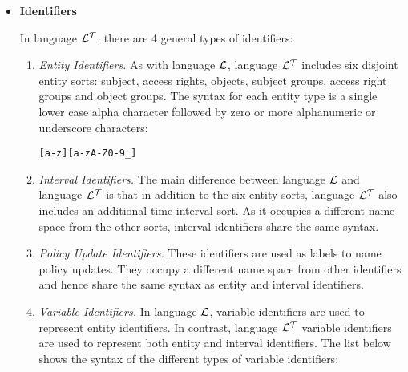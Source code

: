 \documentclass[11pt]{report}
\newenvironment{vverbatim}
{
  \begin{alltt}
}
{
    \vspace{-\baselineskip}
  \end{alltt}
}
\begin{document}
          \begin{itemize}

            \item
              {\bf Identifiers}

                In language ${\cal L^T}$, there are 4 general types of
                identifiers:

                \begin{enumerate}
                  \item
                    {\em Entity Identifiers.}
                    As with language ${\cal L}$, language ${\cal L^T}$
                    includes six disjoint entity sorts: subject, access
                    rights, objects, subject groups, access right groups and
                    object groups. The syntax for each entity type is a single
                    lower case alpha character followed by zero or more
                    alphanumeric or underscore characters:

                    \begin{vverbatim}
  [a-z][a-zA-Z0-9\_]
                    \end{vverbatim}

                  \item
                    {\em Interval Identifiers.}
                    The main difference between language ${\cal L}$ and
                    language ${\cal L^T}$ is that in addition to the six
                    entity sorts, language ${\cal L^T}$ also includes an
                    additional time interval sort. As it occupies a different
                    name space from the other sorts, interval identifiers share
                    the same syntax.
      
                  \item
                    {\em Policy Update Identifiers.}
                    These identifiers are used as labels to name policy
                    updates. They occupy a different name space from other
                    identifiers and hence share the same syntax as entity and
                    interval identifiers.

                  \item
                    {\em Variable Identifiers.}
                    In language ${\cal L}$, variable identifiers are used to
                    represent entity identifiers. In contrast, language
                    ${\cal L^T}$ variable identifiers are used to represent
                    both entity and interval identifiers. The list below shows
                    the syntax of the different types of variable identifiers:


\end{enumerate}
\end{itemize}
\end{document}
